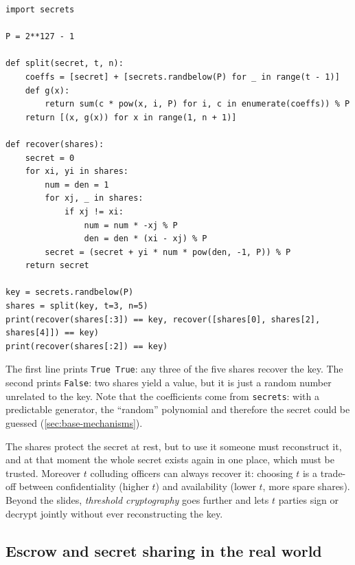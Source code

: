 \begin{verbatim}
import secrets

P = 2**127 - 1

def split(secret, t, n):
    coeffs = [secret] + [secrets.randbelow(P) for _ in range(t - 1)]
    def g(x):
        return sum(c * pow(x, i, P) for i, c in enumerate(coeffs)) % P
    return [(x, g(x)) for x in range(1, n + 1)]

def recover(shares):
    secret = 0
    for xi, yi in shares:
        num = den = 1
        for xj, _ in shares:
            if xj != xi:
                num = num * -xj % P
                den = den * (xi - xj) % P
        secret = (secret + yi * num * pow(den, -1, P)) % P
    return secret

key = secrets.randbelow(P)
shares = split(key, t=3, n=5)
print(recover(shares[:3]) == key, recover([shares[0], shares[2], shares[4]]) == key)
print(recover(shares[:2]) == key)
\end{verbatim}

The first line prints \texttt{True True}: any three of the five shares recover the key. The second prints \texttt{False}: two shares yield a value, but it is just a random number unrelated to the key. Note that the coefficients come from \texttt{secrets}: with a predictable generator, the \enquote{random} polynomial and therefore the secret could be guessed (\cref{sec:base-mechanisms}).

\begin{remark}
The shares protect the secret at rest, but to use it someone must reconstruct it, and at that moment the whole secret exists again in one place, which must be trusted. Moreover $t$ colluding officers can always recover it: choosing $t$ is a trade-off between confidentiality (higher $t$) and availability (lower $t$, more spare shares). Beyond the slides, \emph{threshold cryptography} goes further and lets $t$ parties sign or decrypt jointly without ever reconstructing the key.
\end{remark}

\subsection{Escrow and secret sharing in the real world}

